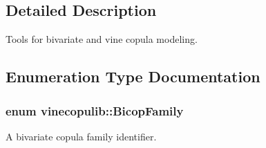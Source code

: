 \subsection{Detailed Description}
Tools for bivariate and vine copula modeling. 

\subsection{Enumeration Type Documentation}
\subsubsection[{\texorpdfstring{Bicop\+Family}{BicopFamily}}]{\setlength{\rightskip}{0pt plus 5cm}enum {\bf vinecopulib\+::\+Bicop\+Family}\hspace{0.3cm}{\ttfamily [strong]}}\hypertarget{namespacevinecopulib_a42e95cc06d33896199caab0c11ad44f3}{}\label{namespacevinecopulib_a42e95cc06d33896199caab0c11ad44f3}


A bivariate copula family identifier. 

